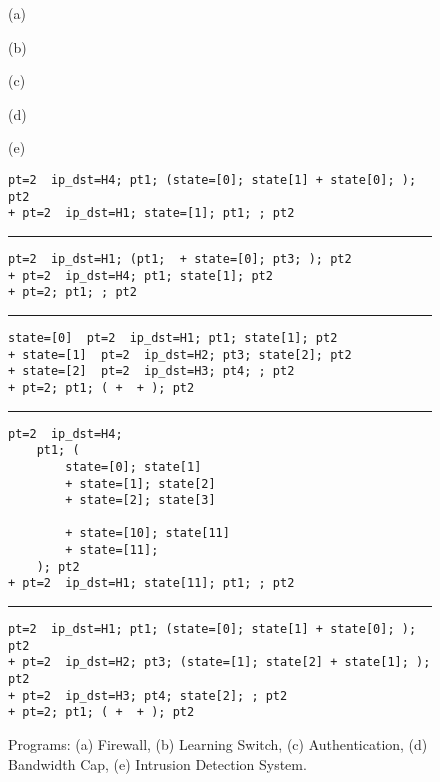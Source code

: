 \documentclass[pldi-cameraready]{sigplanconf}
\begin{document}
\newcommand{\thehrule}{\vspace{6pt}\hrule\vspace{6pt}}\begin{figure}[t]
\begin{minipage}{.1\linewidth}
\vspace{-1.0cm}
(a)

\vspace{1.25cm}

(b)

\vspace{1.75cm}
(c)

\vspace{2.75cm}
(d)

\vspace{3.0cm}
(e)
\end{minipage}\begin{minipage}{.9\linewidth}
\begin{lstlisting}[mathescape]
pt=2  ip_dst=H4; pt1; (state=[0]; state[1] + state[0]; ); pt2
+ pt=2  ip_dst=H1; state=[1]; pt1; ; pt2
\end{lstlisting}
\thehrule
\begin{lstlisting}[mathescape]
pt=2  ip_dst=H1; (pt1;  + state=[0]; pt3; ); pt2
+ pt=2  ip_dst=H4; pt1; state[1]; pt2
+ pt=2; pt1; ; pt2
\end{lstlisting}
\thehrule
\begin{lstlisting}[mathescape]
state=[0]  pt=2  ip_dst=H1; pt1; state[1]; pt2
+ state=[1]  pt=2  ip_dst=H2; pt3; state[2]; pt2
+ state=[2]  pt=2  ip_dst=H3; pt4; ; pt2
+ pt=2; pt1; ( +  + ); pt2
\end{lstlisting}
\thehrule
\begin{lstlisting}[mathescape]
pt=2  ip_dst=H4;
    pt1; (
        state=[0]; state[1]
        + state=[1]; state[2]
        + state=[2]; state[3]
                    
        + state=[10]; state[11]
        + state=[11]; 
    ); pt2
+ pt=2  ip_dst=H1; state[11]; pt1; ; pt2
\end{lstlisting}
\thehrule
\begin{lstlisting}[mathescape]
pt=2  ip_dst=H1; pt1; (state=[0]; state[1] + state[0]; ); pt2
+ pt=2  ip_dst=H2; pt3; (state=[1]; state[2] + state[1]; ); pt2
+ pt=2  ip_dst=H3; pt4; state[2]; ; pt2
+ pt=2; pt1; ( +  + ); pt2
\end{lstlisting}
\end{minipage}
\caption{Programs: (a) Firewall, (b) Learning Switch, (c) Authentication, (d) Bandwidth Cap, (e) Intrusion Detection System.}
\label{fig:examples-code}
\end{figure}
\end{document}
